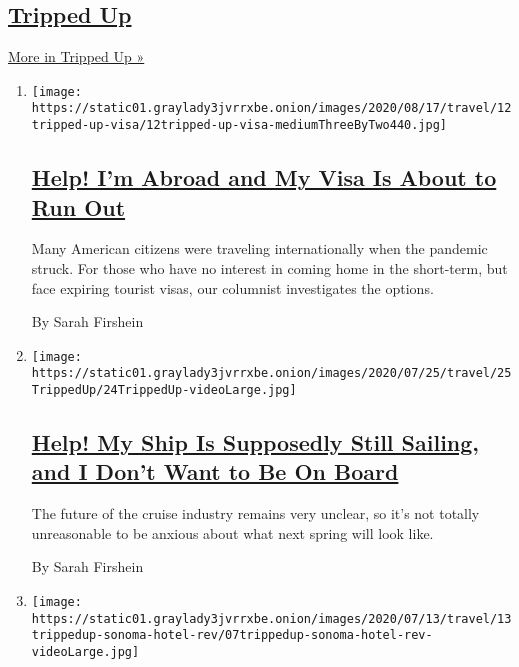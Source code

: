 \hypertarget{tripped-up-1}{%
\subsection{\texorpdfstring{\href{/column/tripped-up}{Tripped
Up}}{Tripped Up}}\label{tripped-up-1}}

\href{/column/tripped-up}{More in Tripped Up »}

\begin{enumerate}
\def\labelenumi{\arabic{enumi}.}
\item
  \texttt{[image: https://static01.graylady3jvrrxbe.onion/images/2020/08/17/travel/12tripped-up-visa/12tripped-up-visa-mediumThreeByTwo440.jpg]}

  \hypertarget{help-im-abroad-and-my-visa-is-about-to-run-out}{%
  \subsection{\texorpdfstring{\href{/2020/08/12/travel/virus-visa-extensions.html}{Help!
  I'm Abroad and My Visa Is About to Run
  Out}}{Help! I'm Abroad and My Visa Is About to Run Out}}\label{help-im-abroad-and-my-visa-is-about-to-run-out}}

  Many American citizens were traveling internationally when the
  pandemic struck. For those who have no interest in coming home in the
  short-term, but face expiring tourist visas, our columnist
  investigates the options.

  By Sarah Firshein
\item
  \texttt{[image: https://static01.graylady3jvrrxbe.onion/images/2020/07/25/travel/25TrippedUp/24TrippedUp-videoLarge.jpg]}

  \hypertarget{help-my-ship-is-supposedly-still-sailing-and-i-dont-want-to-be-on-board}{%
  \subsection{\texorpdfstring{\href{/2020/07/22/travel/virus-cruise-refunds.html}{Help!
  My Ship Is Supposedly Still Sailing, and I Don't Want to Be On
  Board}}{Help! My Ship Is Supposedly Still Sailing, and I Don't Want to Be On Board}}\label{help-my-ship-is-supposedly-still-sailing-and-i-dont-want-to-be-on-board}}

  The future of the cruise industry remains very unclear, so it's not
  totally unreasonable to be anxious about what next spring will look
  like.

  By Sarah Firshein
\item
  \texttt{[image: https://static01.graylady3jvrrxbe.onion/images/2020/07/13/travel/13trippedup-sonoma-hotel-rev/07trippedup-sonoma-hotel-rev-videoLarge.jpg]}


\end{enumerate}
